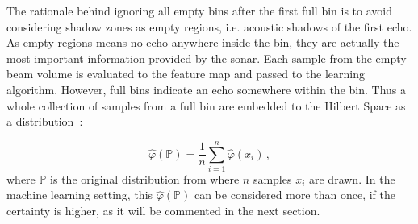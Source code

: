 The rationale behind ignoring all empty bins after the first full bin is to
avoid considering shadow zones as empty regions, i.e. acoustic shadows of the
first echo. As empty regions means no echo anywhere inside the bin, they are
actually the most important information provided by the sonar. Each sample from
the empty beam volume is evaluated to the feature map and passed to the learning
algorithm. However, full bins indicate an echo somewhere within the bin. Thus
a whole collection of samples from a full bin are embedded to the Hilbert Space
as a distribution~\cite{song2013kernel,ramos2016hilbert}:

\begin{equation}
\label{eq:embedding}
\hat{\varphi}(\mathbb{P})=\frac{1}{n}\sum_{i=1}^n\hat{\varphi}(x_i)\,,
\end{equation}
%
where $\mathbb{P}$ is the original distribution from where $n$ samples $x_i$ are
drawn. In the machine learning setting, this $\hat{\varphi}(\mathbb{P})$ can be
considered more than once, if the certainty is higher, as it will be commented
in the next section.
